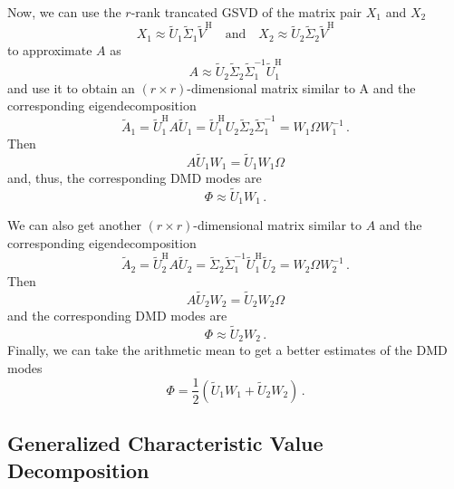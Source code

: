 \documentclass[10pt]{article}
\begin{document}
Now, we can use the $r$-rank trancated GSVD of the matrix pair $X_1$ and $X_2$ 
\begin{equation}
    X_1 \approx \tilde U_1 \tilde \Sigma_{1} \tilde V^\mathrm{H} \quad \mathrm{and}\quad X_2 \approx \tilde U_2 \tilde \Sigma_{2} \tilde V^\mathrm{H}
\end{equation}
to approximate $A$ as
\begin{equation}
    A \approx \tilde U_2 \tilde \Sigma_{2} \tilde \Sigma_{1}^{-1} \tilde U_1^\mathrm{H}
\end{equation}
and use it to obtain an $(r\times r)$-dimensional matrix similar to A and the corresponding eigendecomposition
\begin{equation}
    \tilde A_{1} = \tilde U_1^\mathrm{H} A \tilde U_1= \tilde U_1^\mathrm{H} U_2 \tilde \Sigma_{2} \tilde \Sigma_{1}^{-1}  = W_1 \Omega W_1^{-1}\,.
\end{equation}
Then
\begin{equation}
    A \tilde U_1 W_1 = \tilde U_1  W_1\Omega
\end{equation}
and, thus,  the corresponding DMD modes are
\begin{equation}
    \Phi \approx \tilde U_1 W_1\,. 
\end{equation}

We can also get another $(r\times r)$-dimensional matrix similar to $A$ and the corresponding eigendecomposition
\begin{equation}
    \tilde A_{2} = \tilde U_2^\mathrm{H} A \tilde U_2=  \tilde \Sigma_{2} \tilde \Sigma_{1}^{-1} \tilde U_1^\mathrm{H} \tilde U_2  = W_2 \Omega W_2^{-1}\,.
\end{equation}
Then 
\begin{equation}
    A \tilde U_2 W_2 = \tilde U_2  W_2\Omega
\end{equation}
and the corresponding DMD modes are
\begin{equation}
    \Phi \approx \tilde U_2 W_2\,. 
\end{equation}
Finally, we can take the arithmetic mean to get a better estimates of the DMD modes
\begin{equation}
    \Phi = \frac{1}{2}\left(\tilde U_1 W_1+\tilde U_2 W_2\right)\,. 
\end{equation}

\subsection{Generalized Characteristic Value Decomposition}
\end{document}
